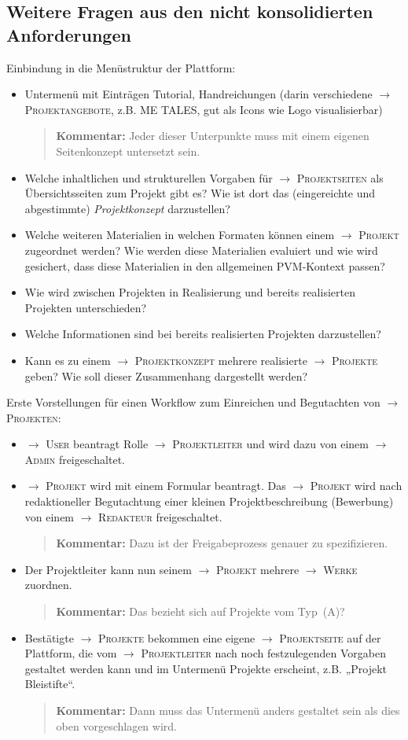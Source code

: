 \documentclass[a4paper,11pt]{article}
\newcommand{\Kommentar}[1]{
  \begin{quote}\textbf{Kommentar:} #1 \end{quote}
}
\newcommand{\glossar}[1]{{$\to$ \textsc{#1}}}
\begin{document}
\subsection{Weitere Fragen aus den nicht konsolidierten Anforderungen} 

Einbindung in die Menüstruktur der Plattform:
\begin{itemize}
\item Untermenü mit Einträgen Tutorial, Handreichungen (darin verschiedene
  \glossar{Projektangebote}, z.B. ME TALES, gut als Icons wie Logo
  visualisierbar) 

  \Kommentar{Jeder dieser Unterpunkte muss mit einem eigenen Seitenkonzept
    untersetzt sein.}
\item Welche inhaltlichen und strukturellen Vorgaben für
  \glossar{Projektseiten} als Übersichtsseiten zum Projekt gibt es? Wie ist
  dort das (eingereichte und abgestimmte) \emph{Projektkonzept} darzustellen? 
\item Welche weiteren Materialien in welchen Formaten können einem
  \glossar{Projekt} zugeordnet werden? Wie werden diese Materialien evaluiert
  und wie wird gesichert, dass diese Materialien in den allgemeinen PVM-Kontext
  passen? 
\item Wie wird zwischen Projekten in Realisierung und bereits realisierten
  Projekten unterschieden?
\item Welche Informationen sind bei bereits realisierten Projekten
  darzustellen? 
\item Kann es zu einem \glossar{Projektkonzept} mehrere realisierte
  \glossar{Projekte} geben? Wie soll dieser Zusammenhang dargestellt werden? 
\end{itemize}

Erste Vorstellungen für einen Workflow zum Einreichen und Begutachten von
\glossar{Projekten}:
\begin{itemize}
\item \glossar{User} beantragt Rolle \glossar{Projektleiter} und wird dazu von
  einem \glossar{Admin} freigeschaltet.
\item \glossar{Projekt} wird mit einem Formular beantragt. Das
  \glossar{Projekt} wird nach redaktioneller Begutachtung einer kleinen
  Projektbeschreibung (Bewerbung) von einem \glossar{Redakteur} freigeschaltet.

  \Kommentar{ Dazu ist der Freigabeprozess genauer zu spezifizieren.}

\item Der Projektleiter kann nun seinem \glossar{Projekt} mehrere
  \glossar{Werke} zuordnen. 

\Kommentar{Das bezieht sich auf Projekte vom Typ~(A)? }

\item Bestätigte \glossar{Projekte} bekommen eine eigene \glossar{Projektseite}
  auf der Plattform, die vom \glossar{Projektleiter} nach noch festzulegenden
  Vorgaben gestaltet werden kann und im Untermenü Projekte erscheint,
  z.B. „Projekt Bleistifte“.

\Kommentar{Dann muss das Untermenü anders gestaltet sein als dies oben
  vorgeschlagen wird.}
\end{itemize}
\end{document}
